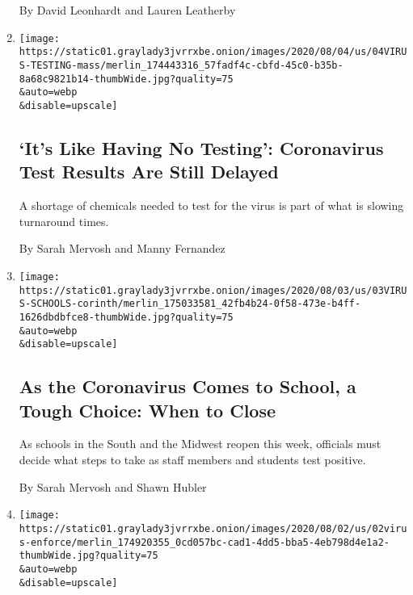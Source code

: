\begin{enumerate}
  By David Leonhardt and Lauren Leatherby
\item
  \href{/2020/08/04/us/virus-testing-delays.html}{}

  \texttt{[image: https://static01.graylady3jvrrxbe.onion/images/2020/08/04/us/04VIRUS-TESTING-mass/merlin\_174443316\_57fadf4c-cbfd-45c0-b35b-8a68c9821b14-thumbWide.jpg?quality=75\\\&auto=webp\\\&disable=upscale]}

  \hypertarget{its-like-having-no-testing-coronavirus-test-results-are-still-delayed}{%
  \subsection{`It's Like Having No Testing': Coronavirus Test Results
  Are Still
  Delayed}\label{its-like-having-no-testing-coronavirus-test-results-are-still-delayed}}

  A shortage of chemicals needed to test for the virus is part of what
  is slowing turnaround times.

  By Sarah Mervosh and Manny Fernandez
\item
  \href{/2020/08/03/us/school-closing-coronavirus.html}{}

  \texttt{[image: https://static01.graylady3jvrrxbe.onion/images/2020/08/03/us/03VIRUS-SCHOOLS-corinth/merlin\_175033581\_42fb4b24-0f58-473e-b4ff-1626dbdbfce8-thumbWide.jpg?quality=75\\\&auto=webp\\\&disable=upscale]}

  \hypertarget{as-the-coronavirus-comes-to-school-a-tough-choice-when-to-close}{%
  \subsection{As the Coronavirus Comes to School, a Tough Choice: When
  to
  Close}\label{as-the-coronavirus-comes-to-school-a-tough-choice-when-to-close}}

  As schools in the South and the Midwest reopen this week, officials
  must decide what steps to take as staff members and students test
  positive.

  By Sarah Mervosh and Shawn Hubler
\item
  \href{/2020/07/31/us/coronavirus-masks-enforcement-key-west.html}{}

  \texttt{[image: https://static01.graylady3jvrrxbe.onion/images/2020/08/02/us/02virus-enforce/merlin\_174920355\_0cd057bc-cad1-4dd5-bba5-4eb798d4e1a2-thumbWide.jpg?quality=75\\\&auto=webp\\\&disable=upscale]}

  \hypertarget{wear-your-mask-please-no-not-on-your-chin}{%
}
\end{enumerate}
